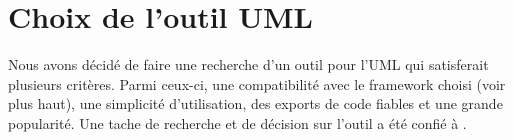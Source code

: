 \documentclass [a4paper] {article}
\begin{document}
\section{Choix de l'outil UML}
Nous avons décidé de faire une recherche d'un outil pour l'UML qui satisferait plusieurs critères. Parmi ceux-ci, une compatibilité avec le framework choisi (voir plus haut), une simplicité d'utilisation, des exports de code fiables et une grande popularité. Une tache de recherche et de décision sur l'outil a été confié à \Julie.


\end{document}
